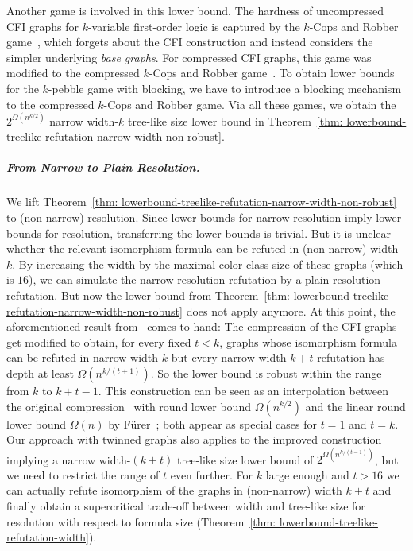 \documentclass[a4paper,english, thm-restate]{lipics-v2021}
\begin{document}
Another game is involved in this lower bound.
The hardness of uncompressed CFI graphs for $k$-variable first-order logic
is captured by the $k$-Cops and Robber game~\cite{SeymourThomas93, DBLP:conf/focs/GroheLNS23},
which forgets about the CFI construction and instead considers the simpler underlying \emph{base graphs}.
For compressed CFI graphs, this game was modified to the compressed $k$-Cops and Robber game~\cite{DBLP:conf/focs/GroheLNS23}.
To obtain lower bounds for the $k$-pebble game with blocking,
we have to introduce a blocking mechanism to the compressed $k$-Cops and Robber game. 
Via all these games, we obtain the 
$2^{\Omega(n^{k/2})}$ narrow width-$k$ tree-like size lower bound in Theorem~\ref{thm: lowerbound-treelike-refutation-narrow-width-non-robust}.

\subparagraph{From Narrow to Plain Resolution.}
We lift Theorem~\ref{thm: lowerbound-treelike-refutation-narrow-width-non-robust} to (non-narrow) resolution.
Since lower bounds for narrow resolution imply lower bounds for resolution,
transferring the lower bounds is trivial.
But it is unclear whether the relevant isomorphism formula can be refuted in (non-narrow) width $k$.
By increasing the width by the maximal color class size of these graphs (which is $16$),
we can simulate the narrow resolution refutation by a plain resolution refutation.
But now the lower bound from Theorem~\ref{thm: lowerbound-treelike-refutation-narrow-width-non-robust} does not apply anymore.
At this point, the aforementioned result from~\cite{RFJN024} comes to hand:
The compression of the CFI graphs get modified to obtain,
for every fixed $t < k$, graphs whose isomorphism formula can be refuted in narrow width $k$ but
every narrow width $k+t$ refutation has depth at least
$\Omega(n^{k/(t+1)})$.
So the lower bound is robust within the range
from $k$ to $k+t-1$.
This construction can be seen as an interpolation between the 
original compression~\cite{DBLP:conf/focs/GroheLNS23} with round lower bound $\Omega(n^{k/2})$
and the linear round lower bound $\Omega(n)$ by Fürer~\cite{Furer2001};
both appear as special cases for $t=1$ and $t=k$.
Our approach with twinned graphs also applies
%
%
to the improved construction implying a narrow width-$(k+t)$ tree-like size lower bound of $2^{\Omega(n^{k/(t-1)})}$, but we need to restrict the range of $t$ even further.
%
%
For $k$ large enough and $t>16$
we can actually refute isomorphism of the graphs in (non-narrow) width $k+t$
and finally obtain a supercritical trade-off between width and
tree-like size for resolution with respect to formula size (Theorem~\ref{thm: lowerbound-treelike-refutation-width}).
\end{document}
